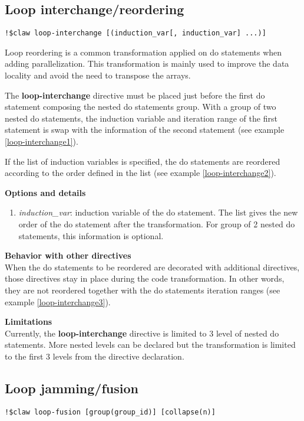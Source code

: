 \documentclass{article}
\begin{document}
\subsection{Loop interchange/reordering}
\begin{lstlisting}
!$claw loop-interchange [(induction_var[, induction_var] ...)]
\end{lstlisting}

Loop reordering is a common transformation applied on do statements when adding parallelization. This transformation is mainly used to improve the data locality and avoid the need to transpose the arrays.

The \textbf{loop-interchange} directive must be placed just before the first do statement composing the nested do statements group. With a group of two nested do statements, the induction variable and iteration range of the first statement is swap with the information of the second statement (see example \ref{loop-interchange1}). 

If the list of induction variables is specified, the do statements are reordered according to the order defined in the list (see example \ref{loop-interchange2}).

\textbf{Options and details}
\begin{enumerate}
\item \textit{induction\_var}: induction variable of the do statement. The list gives the new order of the do statement after the transformation. For group of 2 nested do statements, this information is optional. 
\end{enumerate}


\textbf{Behavior with other directives}\\
When the do statements to be reordered are decorated with additional directives, those directives stay in place during the code transformation. In other words, they are not reordered together with the do statements iteration ranges (see example \ref{loop-interchange3}).

\textbf{Limitations}\\
Currently, the \textbf{loop-interchange} directive is limited to 3 level of nested do statements. More nested levels can be declared but the transformation is limited to the first 3 levels from the directive declaration.

\subsection{Loop jamming/fusion}
\begin{lstlisting}
!$claw loop-fusion [group(group_id)] [collapse(n)]
\end{lstlisting}
\end{document}
